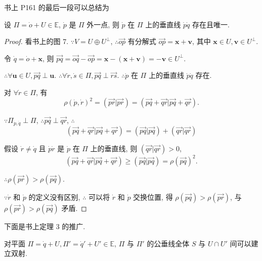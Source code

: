 \documentclass{ctexart}
\begin{document}
书上 P161 的最后一段可以总结为
\begin{theorem}
    设 $\varPi=\dot{o}+U\in\mathbb{E}$, $\dot{p}$ 是 $\varPi$ 外一点, 则 $\dot{p}$ 在 $\varPi$ 上的垂直线 $\dot{p}\dot{q}$ 存在且唯一.
\end{theorem}
\begin{proof}
    看书上的图 7. $\because V=U\oplus U^\perp$, $\therefore\overrightarrow{op}$ 有分解式 $\overrightarrow{op}=\boldsymbol{x}+\boldsymbol{v}$, 其中 $\boldsymbol{x}\in U,\boldsymbol{v}\in U^\perp$.

    令 $\dot{q}=\dot{o}+\boldsymbol{x}$, 则 $\overrightarrow{pq}=\overrightarrow{oq}-\overrightarrow{op}=\boldsymbol{x}-(\boldsymbol{x}+\boldsymbol{v})=-\boldsymbol{v}\in U^\perp$.

    $\therefore\forall\boldsymbol{u}\in U,\overrightarrow{pq}\perp\boldsymbol{u}$. $\therefore\forall\dot{r},\dot{s}\in\varPi,\overrightarrow{pq}\perp\overrightarrow{rs}$. $\therefore\dot{p}$ 在 $\varPi$ 上的垂直线 $\dot{p}\dot{q}$ 存在.

    对 $\forall\dot{r}\in\varPi$, 有
    \[\rho(\dot{p},\dot{r})^2=(\overrightarrow{pr}|\overrightarrow{pr})=(\overrightarrow{pq}+\overrightarrow{qr}|\overrightarrow{pq}+\overrightarrow{qr}).\]

    $\because\varPi_{\dot{p},\dot{q}}\perp\varPi$, $\therefore\overrightarrow{pq}\perp\overrightarrow{qr}$, $\therefore$
    \[(\overrightarrow{pq}+\overrightarrow{qr}|\overrightarrow{pq}+\overrightarrow{qr})=(\overrightarrow{pq}|\overrightarrow{pq})+(\overrightarrow{qr}|\overrightarrow{qr})\]
    
    假设 $\dot{r}\neq\dot{q}$ 且 $\dot{p}\dot{r}$ 是 $\dot{p}$ 在 $\varPi$ 上的垂直线, 则 $(\overrightarrow{qr}|\overrightarrow{qr})>0$,
    \[(\overrightarrow{pq}+\overrightarrow{qr}|\overrightarrow{pq}+\overrightarrow{qr})\geq(\overrightarrow{pq}|\overrightarrow{pq})=\rho(\overrightarrow{pq})^2.\]

    $\therefore\rho(\overrightarrow{pr})>\rho(\overrightarrow{pq})$.

    $\because\dot{r}$ 和 $\dot{p}$ 的定义没有区别, $\therefore$ 可以将 $\dot{r}$ 和 $\dot{p}$ 交换位置, 得 $\rho(\overrightarrow{pq})>\rho(\overrightarrow{pr})$, 与 $\rho(\overrightarrow{pr})>\rho(\overrightarrow{pq})$ 矛盾.
\end{proof}
下面是书上定理 3 的推广.
\begin{theorem}
    对平面 $\varPi=\dot{q}+U,\varPi'=\dot{q}'+U'\in\mathbb{E}$, $\varPi$ 与 $\varPi'$ 的公垂线全体 $S$ 与 $U\cap U'$ 间可以建立双射.
\end{theorem}
\end{document}
